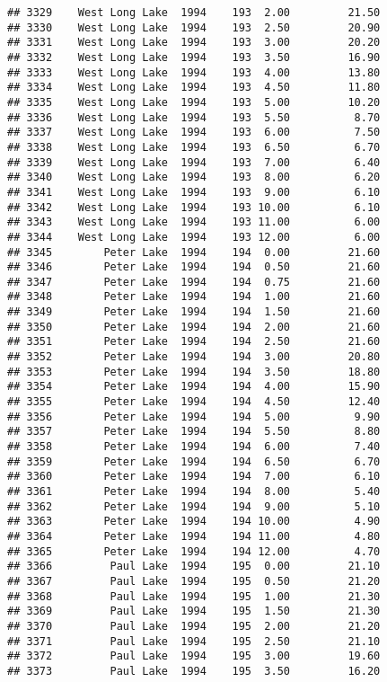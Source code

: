 \documentclass[
]{article}
\begin{document}
\begin{verbatim}
## 3329    West Long Lake  1994    193  2.00         21.50
## 3330    West Long Lake  1994    193  2.50         20.90
## 3331    West Long Lake  1994    193  3.00         20.20
## 3332    West Long Lake  1994    193  3.50         16.90
## 3333    West Long Lake  1994    193  4.00         13.80
## 3334    West Long Lake  1994    193  4.50         11.80
## 3335    West Long Lake  1994    193  5.00         10.20
## 3336    West Long Lake  1994    193  5.50          8.70
## 3337    West Long Lake  1994    193  6.00          7.50
## 3338    West Long Lake  1994    193  6.50          6.70
## 3339    West Long Lake  1994    193  7.00          6.40
## 3340    West Long Lake  1994    193  8.00          6.20
## 3341    West Long Lake  1994    193  9.00          6.10
## 3342    West Long Lake  1994    193 10.00          6.10
## 3343    West Long Lake  1994    193 11.00          6.00
## 3344    West Long Lake  1994    193 12.00          6.00
## 3345        Peter Lake  1994    194  0.00         21.60
## 3346        Peter Lake  1994    194  0.50         21.60
## 3347        Peter Lake  1994    194  0.75         21.60
## 3348        Peter Lake  1994    194  1.00         21.60
## 3349        Peter Lake  1994    194  1.50         21.60
## 3350        Peter Lake  1994    194  2.00         21.60
## 3351        Peter Lake  1994    194  2.50         21.60
## 3352        Peter Lake  1994    194  3.00         20.80
## 3353        Peter Lake  1994    194  3.50         18.80
## 3354        Peter Lake  1994    194  4.00         15.90
## 3355        Peter Lake  1994    194  4.50         12.40
## 3356        Peter Lake  1994    194  5.00          9.90
## 3357        Peter Lake  1994    194  5.50          8.80
## 3358        Peter Lake  1994    194  6.00          7.40
## 3359        Peter Lake  1994    194  6.50          6.70
## 3360        Peter Lake  1994    194  7.00          6.10
## 3361        Peter Lake  1994    194  8.00          5.40
## 3362        Peter Lake  1994    194  9.00          5.10
## 3363        Peter Lake  1994    194 10.00          4.90
## 3364        Peter Lake  1994    194 11.00          4.80
## 3365        Peter Lake  1994    194 12.00          4.70
## 3366         Paul Lake  1994    195  0.00         21.10
## 3367         Paul Lake  1994    195  0.50         21.20
## 3368         Paul Lake  1994    195  1.00         21.30
## 3369         Paul Lake  1994    195  1.50         21.30
## 3370         Paul Lake  1994    195  2.00         21.20
## 3371         Paul Lake  1994    195  2.50         21.10
## 3372         Paul Lake  1994    195  3.00         19.60
## 3373         Paul Lake  1994    195  3.50         16.20

\end{verbatim}
\end{document}

